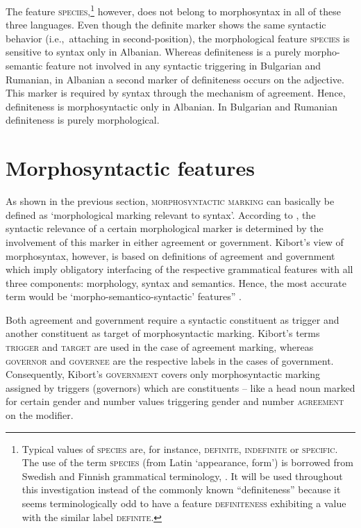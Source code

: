 The feature \textsc{species},\footnote{Typical values of \textsc{species} are, for instance, \textsc{definite, indefinite} or \textsc{specific}. The use of the term \textsc{species} (from Latin ‘appearance, form’) is borrowed from Swedish and Finnish grammatical terminology, \cite[cf., e.g.,][]{holm-etal1970,itkonen-t1980a}. It will be used throughout this investigation instead of the commonly known “definiteness” because it seems terminologically odd to have a feature \textsc{definiteness} exhibiting a value with the similar label \textsc{definite}.} however, does not belong to morphosyntax in all of these three languages. Even though the definite marker shows the same syntactic behavior (i.e.,~attaching in second-position), the morphological feature \textsc{species} is sensitive to syntax only in Albanian. Whereas definiteness is a purely morpho-semantic feature not involved in any syntactic triggering in Bulgarian and Rumanian, in Albanian a second marker of definiteness occurs on the adjective. This marker is required by syntax through the mechanism of agreement. Hence, definiteness is morphosyntactic only in Albanian. In Bulgarian and Rumanian definiteness is purely morphological.

\section{Morphosyntactic features} \label{crit eval}
As shown in the previous section, \textsc{morphosyntactic marking} can basically be defined as ‘morphological marking relevant to syntax’. According to \cite{kibort2010a}, the syntactic relevance of a certain morphological marker is determined by the involvement of this marker in either agreement or government. Kibort's view of morphosyntax, however, is based on definitions of agreement and government which imply obligatory interfacing of the respective grammatical features with all three components: morphology, syntax and semantics. Hence, the most accurate term would be ‘morpho-semantico-syntactic’ features” \citep[cf.]{kibort2010a}.

Both agreement and government require a syntactic constituent as trigger and another constituent as target of morphosyntactic marking. Kibort's terms \textsc{trigger} and \textsc{target} are used in the case of agreement marking, whereas \textsc{governor} and \textsc{governee} are the respective labels in the cases of government. Consequently, Kibort's \textsc{government} covers only morphosyntactic marking assigned by triggers (governors) which are constituents – like a head noun marked for certain gender and number values triggering gender and number \textsc{agreement} on the modifier.

